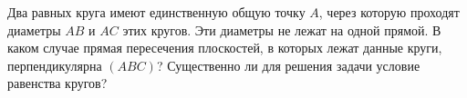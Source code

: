 Два равных круга имеют единственную общую точку $A$, через которую проходят диаметры $AB$ и $AC$ этих кругов. Эти диаметры не лежат на одной прямой. В каком случае прямая пересечения плоскостей, в которых лежат данные круги, перпендикулярна $(ABC)$? Существенно ли для решения задачи условие равенства кругов?